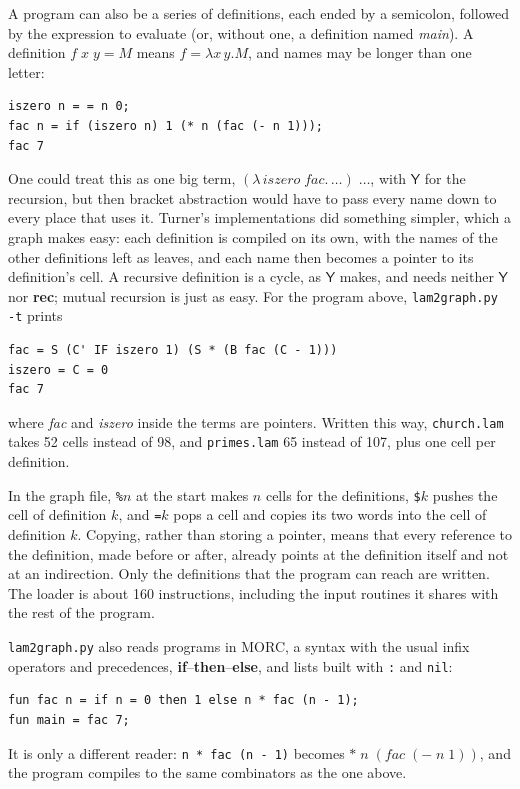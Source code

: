 \documentclass[11pt,a4paper]{article}
\newcommand{\cmb}[1]{\textsf{#1}}
\newcommand{\Y}{\cmb{Y}}
\theoremstyle{definition}
\theoremstyle{plain}
\begin{document}
A program can also be a series of definitions, each ended by a semicolon,
followed by the expression to evaluate (or, without one, a definition named
\textit{main}). A definition $f\;x\;y = M$ means $f = \lambda x\,y.M$, and
names may be longer than one letter:
\begin{lstlisting}[style=plain]
iszero n = = n 0;
fac n = if (iszero n) 1 (* n (fac (- n 1)));
fac 7
\end{lstlisting}
One could treat this as one big term, $(\lambda\,\mathit{iszero}\;\mathit{fac}.\,\ldots)\;\ldots$,
with $\Y$ for the recursion, but then bracket abstraction would have to pass
every name down to every place that uses it. Turner's implementations did
something simpler, which a graph makes easy: each definition is compiled on
its own, with the names of the other definitions left as leaves, and each
name then becomes a pointer to its definition's cell. A recursive definition
is a cycle, as $\Y$ makes, and needs neither $\Y$ nor \textbf{rec}; mutual
recursion is just as easy. For the program above, \texttt{lam2graph.py -t}
prints
\begin{lstlisting}[style=plain]
fac = S (C' IF iszero 1) (S * (B fac (C - 1)))
iszero = C = 0
fac 7
\end{lstlisting}
where \textit{fac} and \textit{iszero} inside the terms are pointers.
Written this way, \texttt{church.lam} takes 52 cells instead of 98, and
\texttt{primes.lam} 65 instead of 107, plus one cell per definition.

In the graph file, \texttt{\%$n$} at the start makes $n$ cells for the
definitions, \texttt{\$$k$} pushes the cell of definition $k$, and
\texttt{=$k$} pops a cell and copies its two words into the cell of
definition $k$. Copying, rather than storing a pointer, means that every
reference to the definition, made before or after, already points at the
definition itself and not at an indirection. Only the definitions that the
program can reach are written. The loader is about 160 instructions,
including the input routines it shares with the rest of the program.

\texttt{lam2graph.py} also reads programs in MORC, a syntax with the usual
infix operators and precedences, \textbf{if}--\textbf{then}--\textbf{else}, and
lists built with \texttt{:} and \texttt{nil}:
\begin{lstlisting}[style=plain]
fun fac n = if n = 0 then 1 else n * fac (n - 1);
fun main = fac 7;
\end{lstlisting}
It is only a different reader: \texttt{n * fac (n - 1)} becomes
${*}\;n\;(\mathit{fac}\;({-}\;n\;1))$, and the program compiles to the same
combinators as the one above.
\end{document}
